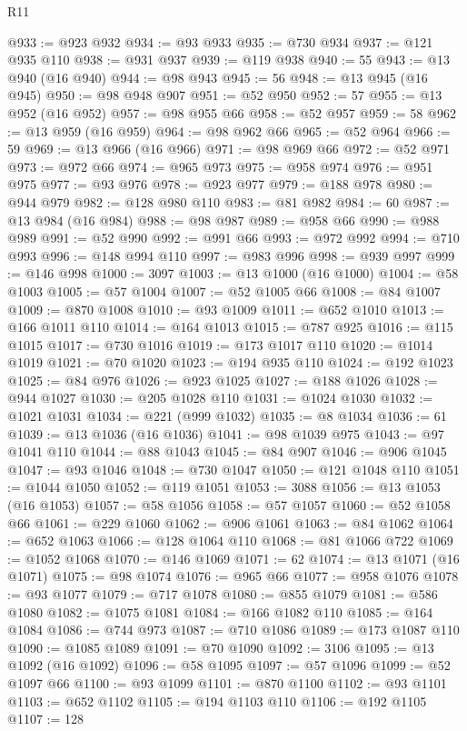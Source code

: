 \begin{lexlean}{R11}
\begin{coremodule}
@933 := @923 @932
@934 := @93 @933
@935 := @730 @934
@937 := @121 @935 @110
@938 := @931 @937
@939 := @119 @938
@940 := 55
@943 := @13 @940 (@16 @940)
@944 := @98 @943
@945 := 56
@948 := @13 @945 (@16 @945)
@950 := @98 @948 @907
@951 := @52 @950
@952 := 57
@955 := @13 @952 (@16 @952)
@957 := @98 @955 @66
@958 := @52 @957
@959 := 58
@962 := @13 @959 (@16 @959)
@964 := @98 @962 @66
@965 := @52 @964
@966 := 59
@969 := @13 @966 (@16 @966)
@971 := @98 @969 @66
@972 := @52 @971
@973 := @972 @66
@974 := @965 @973
@975 := @958 @974
@976 := @951 @975
@977 := @93 @976
@978 := @923 @977
@979 := @188 @978
@980 := @944 @979
@982 := @128 @980 @110
@983 := @81 @982
@984 := 60
@987 := @13 @984 (@16 @984)
@988 := @98 @987
@989 := @958 @66
@990 := @988 @989
@991 := @52 @990
@992 := @991 @66
@993 := @972 @992
@994 := @710 @993
@996 := @148 @994 @110
@997 := @983 @996
@998 := @939 @997
@999 := @146 @998
@1000 := 3097
@1003 := @13 @1000 (@16 @1000)
@1004 := @58 @1003
@1005 := @57 @1004
@1007 := @52 @1005 @66
@1008 := @84 @1007
@1009 := @870 @1008
@1010 := @93 @1009
@1011 := @652 @1010
@1013 := @166 @1011 @110
@1014 := @164 @1013
@1015 := @787 @925
@1016 := @115 @1015
@1017 := @730 @1016
@1019 := @173 @1017 @110
@1020 := @1014 @1019
@1021 := @70 @1020
@1023 := @194 @935 @110
@1024 := @192 @1023
@1025 := @84 @976
@1026 := @923 @1025
@1027 := @188 @1026
@1028 := @944 @1027
@1030 := @205 @1028 @110
@1031 := @1024 @1030
@1032 := @1021 @1031
@1034 := @221 (@999 @1032)
@1035 := @8 @1034
@1036 := 61
@1039 := @13 @1036 (@16 @1036)
@1041 := @98 @1039 @975
@1043 := @97 @1041 @110
@1044 := @88 @1043
@1045 := @84 @907
@1046 := @906 @1045
@1047 := @93 @1046
@1048 := @730 @1047
@1050 := @121 @1048 @110
@1051 := @1044 @1050
@1052 := @119 @1051
@1053 := 3088
@1056 := @13 @1053 (@16 @1053)
@1057 := @58 @1056
@1058 := @57 @1057
@1060 := @52 @1058 @66
@1061 := @229 @1060
@1062 := @906 @1061
@1063 := @84 @1062
@1064 := @652 @1063
@1066 := @128 @1064 @110
@1068 := @81 @1066 @722
@1069 := @1052 @1068
@1070 := @146 @1069
@1071 := 62
@1074 := @13 @1071 (@16 @1071)
@1075 := @98 @1074
@1076 := @965 @66
@1077 := @958 @1076
@1078 := @93 @1077
@1079 := @717 @1078
@1080 := @855 @1079
@1081 := @586 @1080
@1082 := @1075 @1081
@1084 := @166 @1082 @110
@1085 := @164 @1084
@1086 := @744 @973
@1087 := @710 @1086
@1089 := @173 @1087 @110
@1090 := @1085 @1089
@1091 := @70 @1090
@1092 := 3106
@1095 := @13 @1092 (@16 @1092)
@1096 := @58 @1095
@1097 := @57 @1096
@1099 := @52 @1097 @66
@1100 := @93 @1099
@1101 := @870 @1100
@1102 := @93 @1101
@1103 := @652 @1102
@1105 := @194 @1103 @110
@1106 := @192 @1105
@1107 := 128

\end{coremodule}
\end{lexlean}
